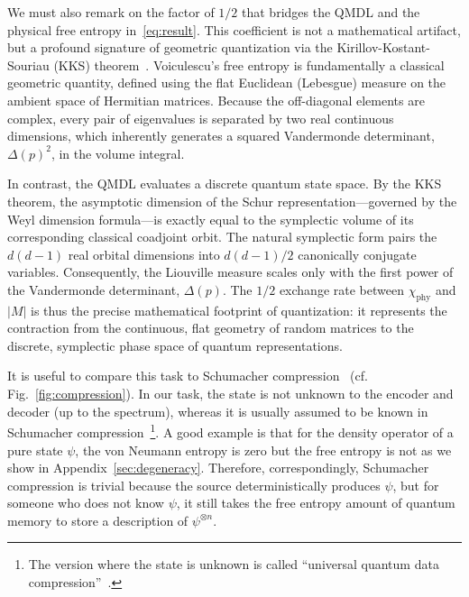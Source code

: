 \documentclass[aps,pre,twocolumn,superscriptaddress,amsmath,amssymb,reprint]{revtex4-2}
\begin{document}
We must also remark on the factor of $1/2$ that bridges the QMDL and the physical free entropy in~\eqref{eq:result}. This coefficient is not a mathematical artifact, but a profound signature of geometric quantization via the Kirillov-Kostant-Souriau (KKS) theorem~\cite{kirillov2025lectures}. Voiculescu's free entropy is fundamentally a classical geometric quantity, defined using the flat Euclidean (Lebesgue) measure on the ambient space of Hermitian matrices. Because the off-diagonal elements are complex, every pair of eigenvalues is separated by two real continuous dimensions, which inherently generates a squared Vandermonde determinant, $\Delta(p)^2$, in the volume integral. 

In contrast, the QMDL evaluates a discrete quantum state space. By the KKS theorem, the asymptotic dimension of the Schur representation—governed by the Weyl dimension formula—is exactly equal to the symplectic volume of its corresponding classical coadjoint orbit. The natural symplectic form pairs the $d(d-1)$ real orbital dimensions into $d(d-1)/2$ canonically conjugate variables. Consequently, the Liouville measure scales only with the first power of the Vandermonde determinant, $\Delta(p)$. The $1/2$ exchange rate between $\chi_\mathrm{phy}$ and $|M|$ is thus the precise mathematical footprint of quantization: it represents the contraction from the continuous, flat geometry of random matrices to the discrete, symplectic phase space of quantum representations.

It is useful to compare this task to Schumacher compression~\cite{schumacher1995quantum} (cf. Fig.~\ref{fig:compression}). In our task, the state is not unknown to the encoder and decoder (up to the spectrum), whereas it is usually assumed to be known in Schumacher compression~\footnote{The version where the state is unknown is called ``universal quantum data compression''~\cite{jozsa1998universal,hayashi2002quantum,hayashi2002simple,hayashi2010universal}.}. A good example is that for the density operator of a pure state $\psi$, the von Neumann entropy is zero but the free entropy is not as we show in Appendix~\ref{sec:degeneracy}. Therefore, correspondingly, Schumacher compression is trivial because the source deterministically produces $\psi$, but for someone who does not know $\psi$, it still takes the free entropy amount of quantum memory to store a description of $\psi^{\otimes n}$.
\end{document}
